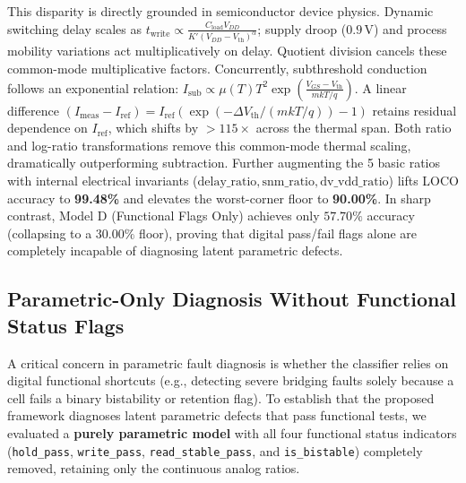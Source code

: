 \documentclass[conference]{IEEEtran}
\begin{document}
This disparity is directly grounded in semiconductor device physics. Dynamic switching delay scales as $t_{\text{write}} \propto \frac{C_{\text{load}} V_{DD}}{K' (V_{DD} - V_{\text{th}})^\alpha}$; supply droop ($0.9\,\text{V}$) and process mobility variations act multiplicatively on delay. Quotient division cancels these common-mode multiplicative factors. Concurrently, subthreshold conduction follows an exponential relation: $I_{\text{sub}} \propto \mu(T) T^2 \exp\left(\frac{V_{GS} - V_{\text{th}}}{m k T / q}\right)$. A linear difference $(I_{\text{meas}} - I_{\text{ref}}) = I_{\text{ref}} \left(\exp(-\Delta V_{\text{th}} / (mkT/q)) - 1\right)$ retains residual dependence on $I_{\text{ref}}$, which shifts by $>115\times$ across the thermal span. Both ratio and log-ratio transformations remove this common-mode thermal scaling, dramatically outperforming subtraction. Further augmenting the 5 basic ratios with internal electrical invariants ($\text{delay\_ratio}, \text{snm\_ratio}, \text{dv\_vdd\_ratio}$) lifts LOCO accuracy to \textbf{99.48\%} and elevates the worst-corner floor to \textbf{90.00\%}. In sharp contrast, Model D (Functional Flags Only) achieves only $57.70\%$ accuracy (collapsing to a $30.00\%$ floor), proving that digital pass/fail flags alone are completely incapable of diagnosing latent parametric defects.

\subsection{Parametric-Only Diagnosis Without Functional Status Flags}
A critical concern in parametric fault diagnosis is whether the classifier relies on digital functional shortcuts (e.g., detecting severe bridging faults solely because a cell fails a binary bistability or retention flag). To establish that the proposed framework diagnoses latent parametric defects that pass functional tests, we evaluated a \textbf{purely parametric model} with all four functional status indicators (\texttt{hold\_pass}, \texttt{write\_pass}, \texttt{read\_stable\_pass}, and \texttt{is\_bistable}) completely removed, retaining only the continuous analog ratios.
\end{document}

